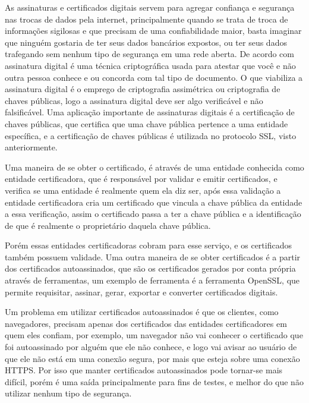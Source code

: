As assinaturas e certificados digitais servem para agregar confiança e segurança
nas trocas de dados pela internet, principalmente quando se trata de troca de informações
sigilosas e que precisam de uma confiabilidade maior, basta imaginar que ninguém
gostaria de ter seus dados bancários expostos, ou ter seus dados trafegando sem
nenhum tipo de segurança em uma rede aberta. De acordo com \cite{kuroseredes2010}
assinatura digital é uma técnica criptográfica usada para atestar que você e não
outra pessoa conhece e ou concorda com tal tipo de documento. O que viabiliza a
assinatura digital é o emprego de criptografia assimétrica ou criptografia de chaves
públicas, logo a assinatura digital deve ser algo verificável e não falsificável. Uma
aplicação importante de assinaturas digitais é a certificação de chaves públicas,
que certifica que uma chave pública pertence a uma entidade específica\cite{kuroseredes2010},
e a certificação de chaves públicas é utilizada no protocolo SSL, visto anteriormente.

Uma maneira de se obter o certificado, é através de uma entidade conhecida como
entidade certificadora, que é responsável por validar e emitir certificados, e
verifica se uma entidade é realmente quem ela diz ser, após essa validação a
entidade certificadora cria um certificado que vincula a chave pública da entidade
a essa verificação, assim o certificado passa a ter a chave pública e a
identificação de que é realmente o proprietário daquela chave pública.

Porém essas entidades certificadoras cobram para esse serviço, e os certificados também
possuem validade. Uma outra maneira de se obter certificados é a partir dos certificados
autoassinados, que são os certificados gerados por conta própria através de
ferramentas, um exemplo de ferramenta é a ferramenta OpenSSL, que permite requisitar,
assinar, gerar, exportar e converter certificados digitais.

Um problema em utilizar certificados autoassinados é que os clientes, como navegadores,
precisam apenas dos certificados das entidades certificadores em quem eles confiam, por
exemplo, um navegador não vai conhecer o certificado que foi autoassinado por
alguém que ele não conhece, e logo vai avisar ao usuário de que ele não está em uma
conexão segura, por mais que esteja sobre uma conexão HTTPS. Por isso que manter certificados
autoassinados pode tornar-se mais difícil, porém é uma saída principalmente para
fins de testes, e melhor do que não utilizar nenhum tipo de segurança.
